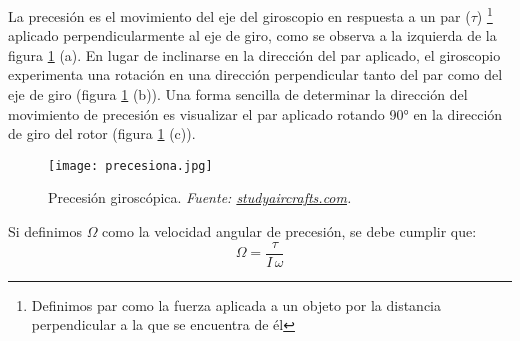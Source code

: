 La precesión es el movimiento del eje del giroscopio en respuesta a un par (\(\tau\)) \footnote{Definimos par como la fuerza aplicada a un objeto por la distancia perpendicular a la que se encuentra de él} aplicado perpendicularmente al eje de giro, como se observa a la izquierda de la figura \ref{fig:superprecesion} (a). En lugar de inclinarse en la dirección del par aplicado, el giroscopio experimenta una rotación en una dirección perpendicular tanto del par como del eje de giro (figura \ref{fig:superprecesion} (b)). Una forma sencilla de determinar la dirección del movimiento de precesión es visualizar el par aplicado rotando 90° en la dirección de giro del rotor (figura \ref{fig:superprecesion} (c)).\\
\begin{figure}[H]
    \centering
    \texttt{[image: precesiona.jpg]}
    \caption{\centering Precesión giroscópica.\textit{  Fuente: \href{https://www.studyaircrafts.com/gyroscopic-instruments}{studyaircrafts.com}.}}
    \label{fig:superprecesion}
\end{figure}
   
   
\begin{definicion}
    Si definimos \(\Omega\) como la velocidad angular de precesión, se debe cumplir que:
    \begin{equation}
    \Omega = \frac{\tau}{I\,\omega}
    \end{equation}
\end{definicion}



